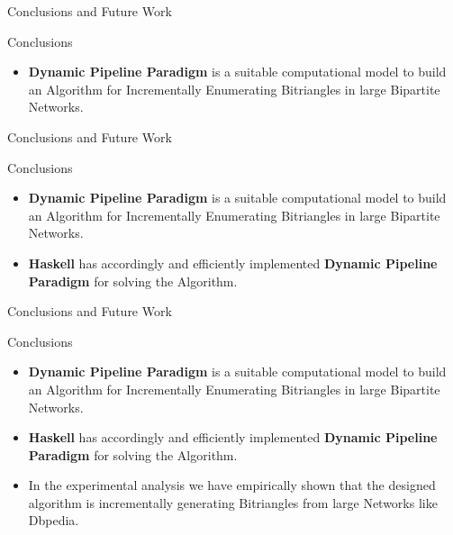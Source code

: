 \begin{frame}[fragile]{Conclusions and Future Work}
  \begin{block}{Conclusions}      
    \begin{itemize}
      \item \textbf{Dynamic Pipeline Paradigm} is a suitable computational model to build an Algorithm for Incrementally Enumerating Bitriangles in large Bipartite Networks. 
    \end{itemize}
  \end{block}
\end{frame}

\begin{frame}[fragile]{Conclusions and Future Work}
  \begin{block}{Conclusions}      
    \begin{itemize}
      \item {\color{light}\textbf{Dynamic Pipeline Paradigm} is a suitable computational model to build an Algorithm for Incrementally Enumerating Bitriangles in large Bipartite Networks. }
      \item \textbf{Haskell} has accordingly and efficiently implemented \textbf{Dynamic Pipeline Paradigm} for solving the Algorithm.
    \end{itemize}
  \end{block}
\end{frame}

\begin{frame}[fragile]{Conclusions and Future Work}
  \begin{block}{Conclusions}      
    \begin{itemize}
      \item {\color{light}\textbf{Dynamic Pipeline Paradigm} is a suitable computational model to build an Algorithm for Incrementally Enumerating Bitriangles in large Bipartite Networks. }
      \item {\color{light}\textbf{Haskell} has accordingly and efficiently implemented \textbf{Dynamic Pipeline Paradigm} for solving the Algorithm.}
      \item In the experimental analysis we have empirically shown that the designed algorithm is incrementally generating Bitriangles from large Networks like Dbpedia. 
    \end{itemize}
  \end{block}
\end{frame}

